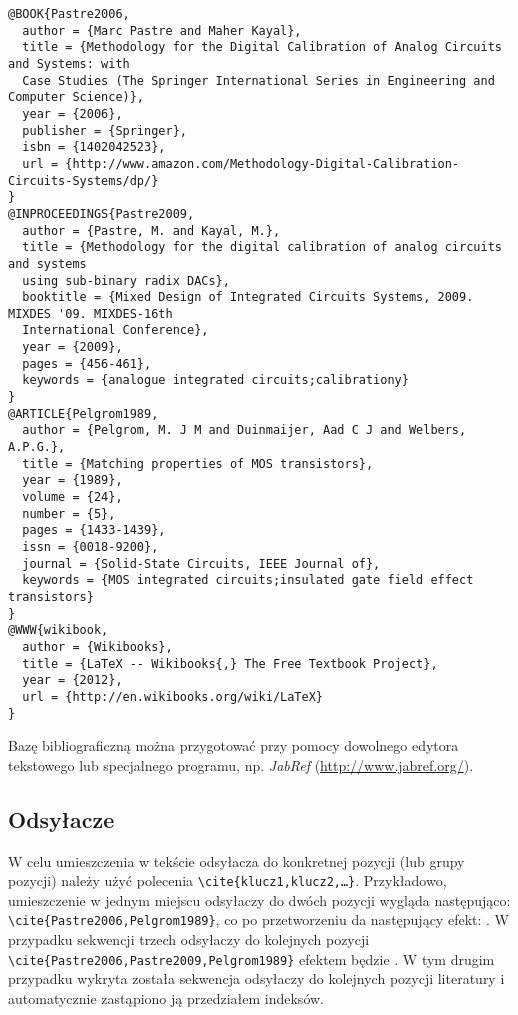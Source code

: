 {\footnotesize \begin{verbatim} 
@BOOK{Pastre2006,
  author = {Marc Pastre and Maher Kayal},
  title = {Methodology for the Digital Calibration of Analog Circuits and Systems: with 
  Case Studies (The Springer International Series in Engineering and Computer Science)},
  year = {2006},
  publisher = {Springer},
  isbn = {1402042523},
  url = {http://www.amazon.com/Methodology-Digital-Calibration-Circuits-Systems/dp/}
}
@INPROCEEDINGS{Pastre2009,
  author = {Pastre, M. and Kayal, M.},
  title = {Methodology for the digital calibration of analog circuits and systems 
  using sub-binary radix DACs},
  booktitle = {Mixed Design of Integrated Circuits Systems, 2009. MIXDES '09. MIXDES-16th
  International Conference},
  year = {2009},
  pages = {456-461},
  keywords = {analogue integrated circuits;calibrationy}
}
@ARTICLE{Pelgrom1989,
  author = {Pelgrom, M. J M and Duinmaijer, Aad C J and Welbers, A.P.G.},
  title = {Matching properties of MOS transistors},
  year = {1989},
  volume = {24},
  number = {5},
  pages = {1433-1439},
  issn = {0018-9200},
  journal = {Solid-State Circuits, IEEE Journal of},
  keywords = {MOS integrated circuits;insulated gate field effect transistors}
}
@WWW{wikibook,
  author = {Wikibooks},
  title = {LaTeX -- Wikibooks{,} The Free Textbook Project},
  year = {2012},
  url = {http://en.wikibooks.org/wiki/LaTeX}
}
\end{verbatim}
}

Bazę bibliograficzną można przygotować przy pomocy dowolnego edytora tekstowego lub specjalnego programu, np. \textit{JabRef} (\url{http://www.jabref.org/}).

\subsection{Odsyłacze}
W celu umieszczenia w tekście odsyłacza do konkretnej pozycji (lub grupy pozycji) należy użyć polecenia \texttt{\textbackslash cite\{klucz1,klucz2,\ldots \}}. Przykładowo,  umieszczenie w jednym miejscu odsyłaczy do dwóch pozycji wygląda następująco: \texttt{\textbackslash cite\{Pastre2006,Pelgrom1989\}}, co po przetworzeniu  da następujący efekt: \cite{Pastre2006,Pelgrom1989}. W przypadku sekwencji trzech odsyłaczy do kolejnych pozycji \texttt{\textbackslash cite\{Pastre2006,Pastre2009,Pelgrom1989\}}  efektem będzie \cite{Pastre2006,Pastre2009,Pelgrom1989}. W tym drugim przypadku wykryta została sekwencja odsyłaczy do  kolejnych pozycji literatury i automatycznie zastąpiono ją przedziałem indeksów. 

